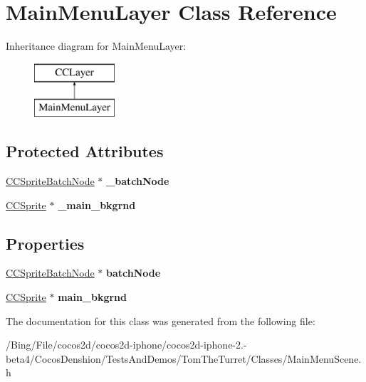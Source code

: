 \hypertarget{interface_main_menu_layer}{\section{Main\-Menu\-Layer Class Reference}
\label{interface_main_menu_layer}
}
Inheritance diagram for Main\-Menu\-Layer\-:\begin{figure}[H]
\begin{center}
\leavevmode
\includegraphics[height=2.000000cm]{interface_main_menu_layer}
\end{center}
\end{figure}
\subsection*{Protected Attributes}
\begin{DoxyCompactItemize}
\item 
\hypertarget{interface_main_menu_layer_ab683ff24409efe62c66ff33ce53244bd}{\hyperlink{interface_c_c_sprite_batch_node}{C\-C\-Sprite\-Batch\-Node} $\ast$ {\bfseries \-\_\-batch\-Node}}\label{interface_main_menu_layer_ab683ff24409efe62c66ff33ce53244bd}

\item 
\hypertarget{interface_main_menu_layer_a214cf9df05b835ace95447d369c2606c}{\hyperlink{class_c_c_sprite}{C\-C\-Sprite} $\ast$ {\bfseries \-\_\-main\-\_\-bkgrnd}}\label{interface_main_menu_layer_a214cf9df05b835ace95447d369c2606c}

\end{DoxyCompactItemize}
\subsection*{Properties}
\begin{DoxyCompactItemize}
\item 
\hypertarget{interface_main_menu_layer_a1447544828d6c56e190c0517be339ceb}{\hyperlink{interface_c_c_sprite_batch_node}{C\-C\-Sprite\-Batch\-Node} $\ast$ {\bfseries batch\-Node}}\label{interface_main_menu_layer_a1447544828d6c56e190c0517be339ceb}

\item 
\hypertarget{interface_main_menu_layer_a6873dd25a182432668adebdb34f65241}{\hyperlink{class_c_c_sprite}{C\-C\-Sprite} $\ast$ {\bfseries main\-\_\-bkgrnd}}\label{interface_main_menu_layer_a6873dd25a182432668adebdb34f65241}

\end{DoxyCompactItemize}


The documentation for this class was generated from the following file\-:\begin{DoxyCompactItemize}
\item 
/\-Bing/\-File/cocos2d/cocos2d-\/iphone/cocos2d-\/iphone-\/2.-\/beta4/\-Cocos\-Denshion/\-Tests\-And\-Demos/\-Tom\-The\-Turret/\-Classes/Main\-Menu\-Scene.\-h\end{DoxyCompactItemize}
